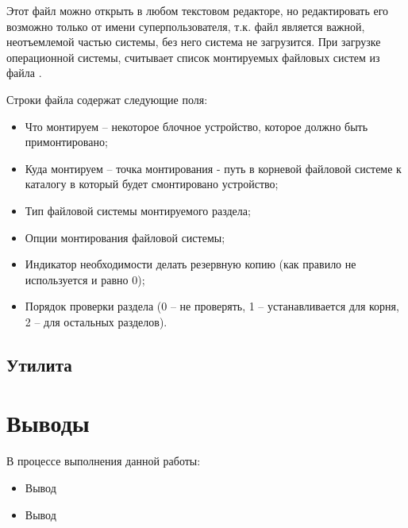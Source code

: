 Этот файл можно открыть в любом текстовом редакторе, но редактировать его возможно только от имени суперпользователя, т.к. файл является важной, неотъемлемой частью системы, без него система не загрузится. При загрузке операционной системы,  считывает список монтируемых файловых систем из файла .



Строки файла содержат следующие поля:
\begin{itemize}
	\item Что монтируем -- некоторое блочное устройство, которое должно быть примонтировано;
	\item Куда монтируем -- точка монтирования - путь в корневой файловой системе к каталогу в который будет смонтировано устройство;
	\item Тип файловой системы монтируемого раздела;
	\item Опции монтирования файловой системы;
	\item Индикатор необходимости делать резервную копию (как правило не используется и равно 0);
	\item Порядок проверки раздела (0 -- не проверять, 1 -- устанавливается для корня, 2 -- для остальных разделов).
\end{itemize}

\subsection{Утилита }

\section{Выводы}

В процессе выполнения данной работы:
\begin{itemize}
	\item Вывод
	\item Вывод
\end{itemize}



